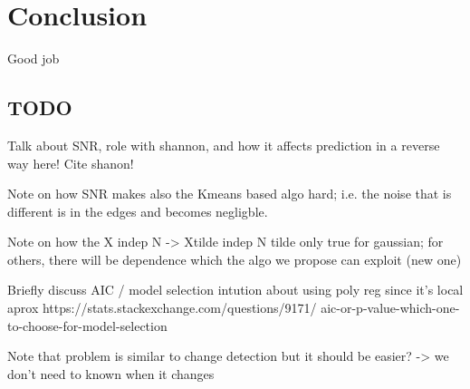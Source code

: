 \chapter{Conclusion}

Good job

\section{TODO}

Talk about SNR, role with shannon, and how it affects prediction in a reverse way here! Cite shanon!

Note on how SNR makes also the Kmeans based algo hard; i.e. the noise that is different is 
in the edges and becomes negligble.

Note on how the X indep N -> Xtilde indep N tilde only true for gaussian; for others, there 
will be dependence which the algo we propose can exploit (new one)


Briefly discuss AIC / model selection
intution about using poly reg since it's local
aprox
https://stats.stackexchange.com/questions/9171/
aic-or-p-value-which-one-to-choose-for-model-selection

Note that problem is similar to change detection
but it should be easier? -> we don't need to known
when it changes


